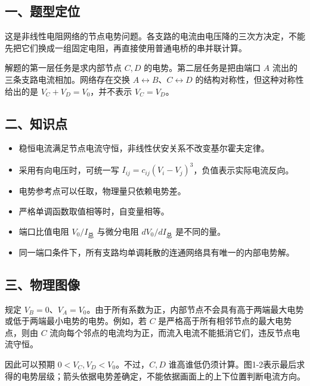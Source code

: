 \documentclass[12pt,a4paper,fontset=fandol]{ctexart}
\providecommand{\tightlist}{\setlength{\itemsep}{0pt}\setlength{\parskip}{0pt}}
\begin{document}
\subsection{一、题型定位}\label{ux4e00ux9898ux578bux5b9aux4f4d}

这是非线性电阻网络的节点电势问题。各支路的电流由电压降的三次方决定，不能先把它们换成一组固定电阻，再直接使用普通电桥的串并联计算。

解题的第一层任务是求内部节点 \(C,D\) 的电势。第二层任务是把由端口 \(A\)
流出的三条支路电流相加。网络存在交换
\(A\leftrightarrow B\)、\(C\leftrightarrow D\)
的结构对称性，但这种对称性给出的是 \(V_C+V_D=V_0\)，并不表示
\(V_C=V_D\)。

\subsection{二、知识点}\label{ux4e8cux77e5ux8bc6ux70b9}

\begin{itemize}
\tightlist
\item
  稳恒电流满足节点电流守恒，非线性伏安关系不改变基尔霍夫定律。
\item
  采用有向电压时，可统一写
  \(I_{ij}=c_{ij}(V_i-V_j)^3\)，负值表示实际电流反向。
\item
  电势参考点可以任取，物理量只依赖电势差。
\item
  严格单调函数取值相等时，自变量相等。
\item
  端口比值电阻 \(V_0/I_{\text{总}}\) 与微分电阻 \(dV_0/dI_{\text{总}}\)
  是不同的量。
\item
  同一端口条件下，所有支路均单调耗散的连通网络具有唯一的内部电势解。
\end{itemize}

\subsection{三、物理图像}\label{ux4e09ux7269ux7406ux56feux50cf}

规定
\(V_B=0\)、\(V_A=V_0\)。由于所有系数为正，内部节点不会具有高于两端最大电势或低于两端最小电势的电势。例如，若
\(C\) 是严格高于所有相邻节点的最大电势点，则由 \(C\)
流向每个邻点的电流均为正，而流入电流不能抵消它们，违反节点电流守恒。

因此可以预期 \(0<V_C,V_D<V_0\)。不过，\(C,D\)
谁高谁低仍须计算。图1-2表示最后求得的电势层级；箭头依据电势差确定，不能依据画面上的上下位置判断电流方向。
\end{document}

